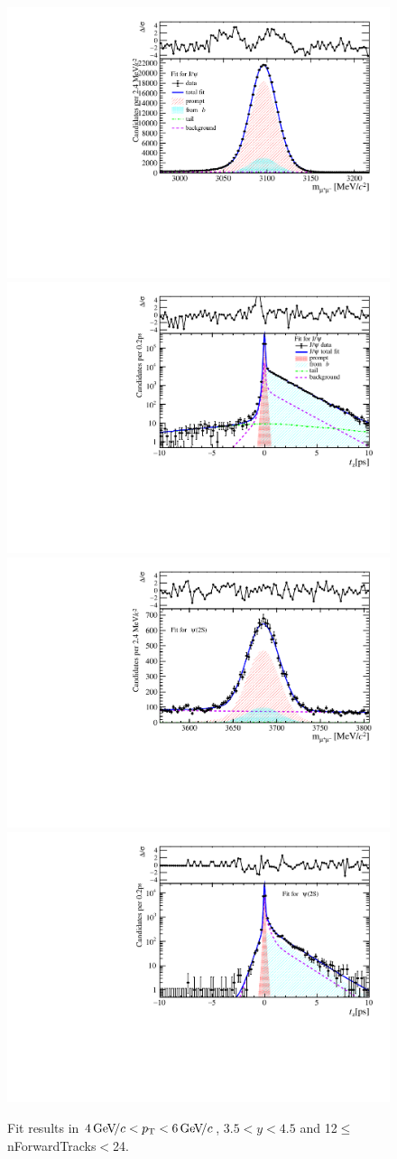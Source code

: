 \begin{figure}[H]
\begin{center}
\includegraphics[width=0.47\linewidth]{pdf/Jpsi/drawmassF/n2y3pt3.pdf}
\includegraphics[width=0.47\linewidth]{pdf/Jpsi/2DFitF/n2y3pt3.pdf}
\vspace*{-0.5cm}
\includegraphics[width=0.47\linewidth]{pdf/Psi2S/drawmassF/n2y3pt3.pdf}
\includegraphics[width=0.47\linewidth]{pdf/Psi2S/2DFitF/n2y3pt3.pdf}
\vspace*{-0.5cm}
\end{center}
\caption{Fit results in $4\text{\,Ge\kern -0.1em V\!/}c<p_{\mathrm{T}}<6\text{\,Ge\kern -0.1em V\!/}c$, $3.5<y<4.5$ and 12$\leq$nForwardTracks$<$24.}
\label{Fitn2y3pt3}
\end{figure}
